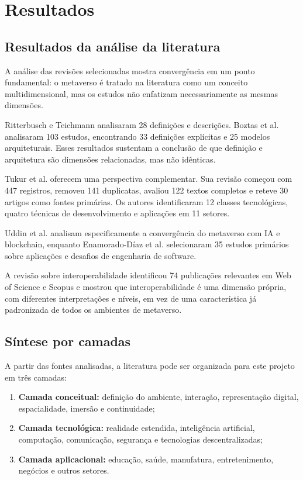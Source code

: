 \chapter{Resultados}
\label{cha:resultados}

\section{Resultados da análise da literatura}

A análise das revisões selecionadas mostra convergência em um ponto fundamental: o metaverso é tratado na literatura como um conceito multidimensional, mas os estudos não enfatizam necessariamente as mesmas dimensões.

Ritterbusch e Teichmann analisaram 28 definições e descrições. Boztas et al. analisaram 103 estudos, encontrando 33 definições explícitas e 25 modelos arquiteturais. Esses resultados sustentam a conclusão de que definição e arquitetura são dimensões relacionadas, mas não idênticas. \cite{ritterbusch2023,boztas2025}

Tukur et al. oferecem uma perspectiva complementar. Sua revisão começou com 447 registros, removeu 141 duplicatas, avaliou 122 textos completos e reteve 30 artigos como fontes primárias. Os autores identificaram 12 classes tecnológicas, quatro técnicas de desenvolvimento e aplicações em 11 setores. \cite{tukur2024}

Uddin et al. analisam especificamente a convergência do metaverso com IA e blockchain, enquanto Enamorado-Díaz et al. selecionaram 35 estudos primários sobre aplicações e desafios de engenharia de software. \cite{uddin2024,enamorado2025}

A revisão sobre interoperabilidade identificou 74 publicações relevantes em Web of Science e Scopus e mostrou que interoperabilidade é uma dimensão própria, com diferentes interpretações e níveis, em vez de uma característica já padronizada de todos os ambientes de metaverso. \cite{yang2025}

\section{Síntese por camadas}

A partir das fontes analisadas, a literatura pode ser organizada para este projeto em três camadas:

\begin{enumerate}
    \item \textbf{Camada conceitual:} definição do ambiente, interação, representação digital, espacialidade, imersão e continuidade;
    \item \textbf{Camada tecnológica:} realidade estendida, inteligência artificial, computação, comunicação, segurança e tecnologias descentralizadas;
    \item \textbf{Camada aplicacional:} educação, saúde, manufatura, entretenimento, negócios e outros setores.
\end{enumerate}

